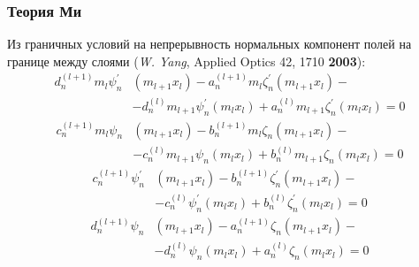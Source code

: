 \documentclass[14pt]{beamer}
\begin{document}
\begin{frame}
  \frametitle{Теория Ми}
  \small
  Из граничных условий на непрерывность
нормальных компонент полей на границе между слоями (\textit{W. Yang},
Applied Optics 42, 1710 \textbf{2003}):
\begin{equation*} %
    \begin{alignedat}{2}
d^{(l+1)}_{n}m_{l} \psi^{\prime}_{n}&{\left (m_{l+1} x_{l} \right )}
- a^{(l+1)}_{n} m_{l} \zeta^{\prime}_{n}{\left (m_{l+1} x_{l} \right )}-\\
& - d^{(l)}_{n} m_{l+1} \psi^{\prime}_{n}{\left (m_{l} x_{l} \right )} 
+ a^{(l)}_{n} m_{l+1} \zeta^{\prime}_{n}{\left (m_{l} x_{l} \right )}
= 0
\end{alignedat}
\end{equation*}
\begin{equation*} %
  \label{eq:A2d2}
\begin{alignedat}{2}
c^{(l+1)}_{n} m_{l} \psi_{n}&{\left (m_{l+1} x_{l} \right )}
  - b^{(l+1)}_{n} m_{l} \zeta_{n}{\left (m_{l+1} x_{l} \right )}-\\
&- c^{(l)}_{n} m_{l+1} \psi_{n}{\left (m_{l} x_{l} \right )} 
+b^{(l)}_{n} m_{l+1} \zeta_{n}{\left (m_{l} x_{l} \right )}  =0
\end{alignedat}
\end{equation*}
\begin{equation*} %
  \label{eq:A2d3}
\begin{alignedat}{2}
c^{(l+1)}_{n} \psi^{\prime}_{n}&{\left (m_{l+1} x_{l} \right )}
- b^{(l+1)}_{n} \zeta^{\prime}_{n}{\left (m_{l+1} x_{l} \right )}-\\
&- c^{(l)}_{n} \psi^{\prime}_{n}{\left (m_{l} x_{l} \right )} 
+b^{(l)}_{n} \zeta^{\prime}_{n}{\left (m_{l} x_{l} \right )}   =0
\end{alignedat}
\end{equation*}
\begin{equation*} %
\begin{alignedat}{2}
 d^{(l+1)}_{n} \psi_{n}&{\left (m_{l+1} x_{l} \right )}
- a^{(l+1)}_{n} \zeta_{n}{\left (m_{l+1} x_{l} \right )}-\\
& - d^{(l)}_{n} \psi_{n}{\left (m_{l} x_{l} \right )} 
+ a^{(l)}_{n} \zeta_{n}{\left (m_{l} x_{l} \right )}   =0
\end{alignedat}
\end{equation*}
\end{frame}
\end{document}
